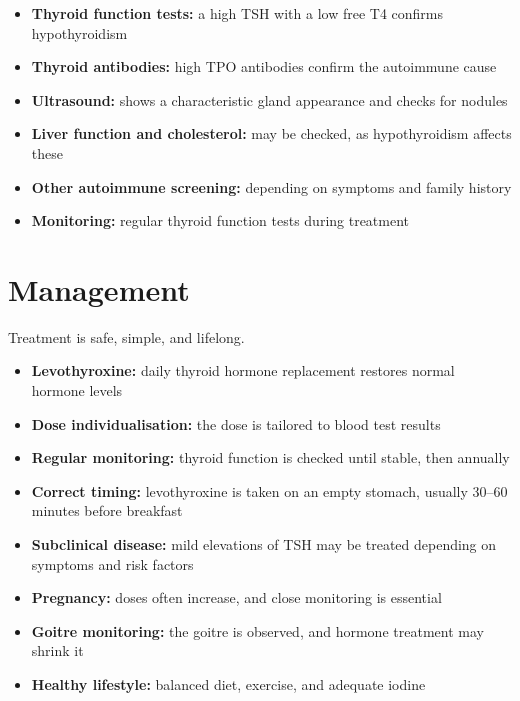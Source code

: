 \begin{itemize}
    \item \textbf{Thyroid function tests:} a high TSH with a low free T4 confirms hypothyroidism
    \item \textbf{Thyroid antibodies:} high TPO antibodies confirm the autoimmune cause
    \item \textbf{Ultrasound:} shows a characteristic gland appearance and checks for nodules
    \item \textbf{Liver function and cholesterol:} may be checked, as hypothyroidism affects these
    \item \textbf{Other autoimmune screening:} depending on symptoms and family history
    \item \textbf{Monitoring:} regular thyroid function tests during treatment
\end{itemize}

\section*{Management}
Treatment is safe, simple, and lifelong.

\begin{itemize}
    \item \textbf{Levothyroxine:} daily thyroid hormone replacement restores normal hormone levels
    \item \textbf{Dose individualisation:} the dose is tailored to blood test results
    \item \textbf{Regular monitoring:} thyroid function is checked until stable, then annually
    \item \textbf{Correct timing:} levothyroxine is taken on an empty stomach, usually 30--60 minutes before breakfast
    \item \textbf{Subclinical disease:} mild elevations of TSH may be treated depending on symptoms and risk factors
    \item \textbf{Pregnancy:} doses often increase, and close monitoring is essential
    \item \textbf{Goitre monitoring:} the goitre is observed, and hormone treatment may shrink it
    \item \textbf{Healthy lifestyle:} balanced diet, exercise, and adequate iodine
\end{itemize}

